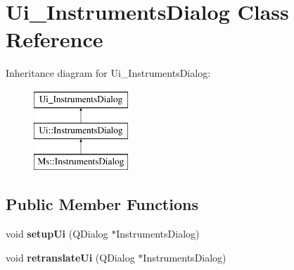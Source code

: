 \hypertarget{class_ui___instruments_dialog}{}\section{Ui\+\_\+\+Instruments\+Dialog Class Reference}
\label{class_ui___instruments_dialog}
Inheritance diagram for Ui\+\_\+\+Instruments\+Dialog\+:\begin{figure}[H]
\begin{center}
\leavevmode
\includegraphics[height=3.000000cm]{class_ui___instruments_dialog}
\end{center}
\end{figure}
\subsection*{Public Member Functions}
\begin{DoxyCompactItemize}
\item 
\mbox{\label{class_ui___instruments_dialog_a5251c7a2236b0c982d8a7ffc9d31f558}} 
void {\bfseries setup\+Ui} (Q\+Dialog $\ast$Instruments\+Dialog)
\item 
\mbox{\label{class_ui___instruments_dialog_ae7c6ba841292120eacb71323f3a70154}} 
void {\bfseries retranslate\+Ui} (Q\+Dialog $\ast$Instruments\+Dialog)
\end{DoxyCompactItemize}
